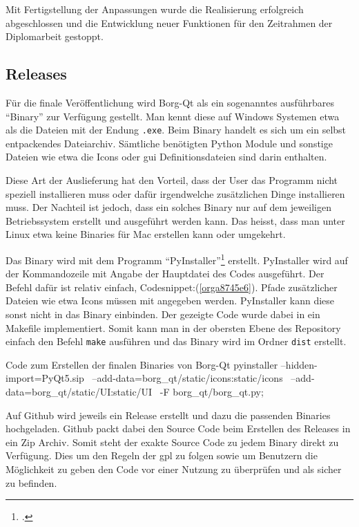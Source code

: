 Mit Fertigstellung der Anpassungen wurde die Realisierung erfolgreich
abgeschlossen und die Entwicklung neuer Funktionen für den Zeitrahmen der
Diplomarbeit gestoppt.

\subsection{Releases}
\label{sec:org3adb3b3}

Für die finale Veröffentlichung wird Borg-Qt als ein sogenanntes ausführbares
"`Binary"' zur Verfügung gestellt. Man kennt diese auf Windows Systemen etwa als
die Dateien mit der Endung \texttt{.exe}. Beim Binary handelt es sich um ein selbst
entpackendes Dateiarchiv. Sämtliche benötigten Python Module und sonstige
Dateien wie etwa die Icons oder \gls{gui} Definitionsdateien sind darin
enthalten.

Diese Art der Auslieferung hat den Vorteil, dass der User das Programm nicht
speziell installieren muss oder dafür irgendwelche zusätzlichen Dinge
installieren muss. Der Nachteil ist jedoch, dass ein solches Binary nur auf dem
jeweiligen Betriebssystem erstellt und ausgeführt werden kann. Das heisst, dass
man unter Linux etwa keine Binaries für Mac erstellen kann oder umgekehrt.

Das Binary wird mit dem Programm "`PyInstaller"'\footcite{pyinstaller} erstellt.
PyInstaller wird auf der Kommandozeile mit Angabe der Hauptdatei des Codes
ausgeführt. Der Befehl dafür ist relativ einfach,
Codesnippet:(\ref{orga8745e6}). Pfade zusätzlicher Dateien wie etwa Icons
müssen mit angegeben werden. PyInstaller kann diese sonst nicht in das Binary
einbinden. Der gezeigte Code wurde dabei in ein Makefile implementiert. Somit
kann man in der obersten Ebene des Repository einfach den Befehl \texttt{make}
ausführen und das Binary wird im Ordner \texttt{dist} erstellt.

\begin{sexylisting}[label=orga8745e6]{Code zum Erstellen der finalen Binaries von Borg-Qt}
pyinstaller --hidden-import=PyQt5.sip \
    --add-data=borg_qt/static/icons:static/icons \
    --add-data=borg_qt/static/UI:static/UI \
    -F borg_qt/borg_qt.py; \
\end{sexylisting}

Auf Github wird jeweils ein Release erstellt und dazu die passenden Binaries
hochgeladen. Github packt dabei den Source Code beim Erstellen des Releases in
ein Zip Archiv. Somit steht der exakte Source Code zu jedem Binary direkt zu
Verfügung. Dies um den Regeln der \gls{gpl} zu folgen sowie um Benutzern die
Möglichkeit zu geben den Code vor einer Nutzung zu überprüfen und als sicher zu
befinden.

